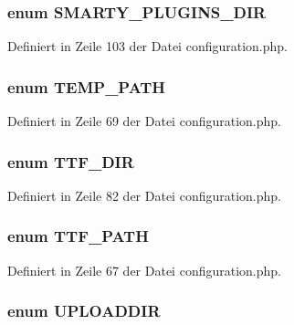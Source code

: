 \subsubsection{\setlength{\rightskip}{0pt plus 5cm}enum {\bf SMARTY\_\-PLUGINS\_\-DIR}}\label{configuration_8php_9ad6fcd96b03a7fc2ee1dbb66c49782c}




Definiert in Zeile 103 der Datei configuration.php.
\subsubsection{\setlength{\rightskip}{0pt plus 5cm}enum {\bf TEMP\_\-PATH}}\label{configuration_8php_52adde529d05fcc07619971e6a1f0e42}




Definiert in Zeile 69 der Datei configuration.php.
\subsubsection{\setlength{\rightskip}{0pt plus 5cm}enum {\bf TTF\_\-DIR}}\label{configuration_8php_4904dd87af8bd1069cf49e71863de2c3}




Definiert in Zeile 82 der Datei configuration.php.
\subsubsection{\setlength{\rightskip}{0pt plus 5cm}enum {\bf TTF\_\-PATH}}\label{configuration_8php_004567de9b16f45ab7d912b39a32ded0}




Definiert in Zeile 67 der Datei configuration.php.
\subsubsection{\setlength{\rightskip}{0pt plus 5cm}enum {\bf UPLOADDIR}}\label{configuration_8php_a7afbd5f1a5bc71adc727190c98eb3e2}




